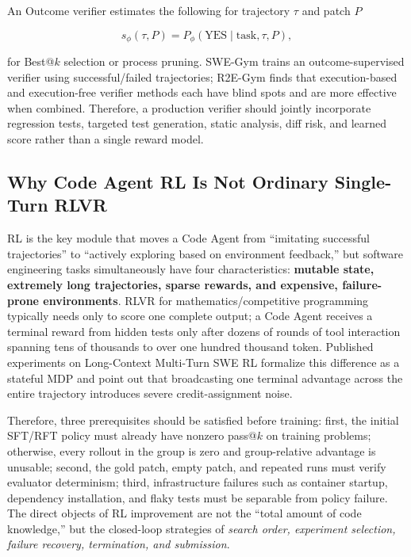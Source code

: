 \documentclass[10pt,a4paper,UTF8,fontset=none]{ctexart}
\begin{document}
An Outcome verifier estimates the following for trajectory $\tau$ and patch $P$

\begin{equation}
s_{\phi}(\tau,P)=P_{\phi}(\mathrm{YES}\mid \text{task},\tau,P),
\label{eq:verifier}
\end{equation}

for Best@$k$ selection or process pruning. SWE-Gym trains an outcome-supervised verifier using successful/failed trajectories\cite{pan2024swegym}; R2E-Gym finds that execution-based and execution-free verifier methods each have blind spots and are more effective when combined\cite{jain2025r2egym}. Therefore, a production verifier should jointly incorporate regression tests, targeted test generation, static analysis, diff risk, and learned score rather than a single reward model.

\subsection{Why Code Agent RL Is Not Ordinary Single-Turn RLVR}

RL is the key module that moves a Code Agent from ``imitating successful trajectories'' to ``actively exploring based on environment feedback,'' but software engineering tasks simultaneously have four characteristics: \textbf{mutable state, extremely long trajectories, sparse rewards, and expensive, failure-prone environments}. RLVR for mathematics/competitive programming typically needs only to score one complete output; a Code Agent receives a terminal reward from hidden tests only after dozens of rounds of tool interaction spanning tens of thousands to over one hundred thousand token. Published experiments on Long-Context Multi-Turn SWE RL formalize this difference as a stateful MDP and point out that broadcasting one terminal advantage across the entire trajectory introduces severe credit-assignment noise\cite{golubev2025longcontextrl}.

Therefore, three prerequisites should be satisfied before training: first, the initial SFT/RFT policy must already have nonzero pass@$k$ on training problems; otherwise, every rollout in the group is zero and group-relative advantage is unusable; second, the gold patch, empty patch, and repeated runs must verify evaluator determinism; third, infrastructure failures such as container startup, dependency installation, and flaky tests must be separable from policy failure. The direct objects of RL improvement are not the ``total amount of code knowledge,'' but the closed-loop strategies of \emph{search order, experiment selection, failure recovery, termination, and submission}.
\end{document}
